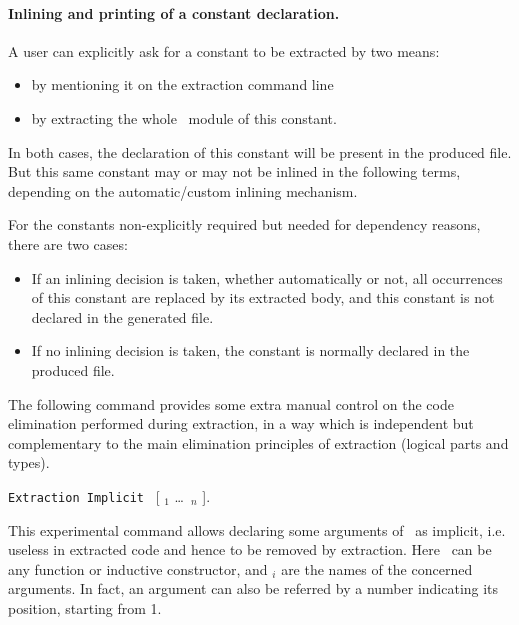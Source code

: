 \paragraph{Inlining and printing of a constant declaration.}

A user can explicitly ask for a constant to be extracted by two means:
\begin{itemize}
\item by mentioning it on the extraction command line
\item by extracting the whole \Coq\ module of this constant.
\end{itemize}
In both cases, the declaration of this constant will be present in the
produced file. 
But this same constant may or may not be inlined in the following
terms, depending on the automatic/custom inlining mechanism.  


For the constants non-explicitly required but needed for dependency
reasons, there are two cases: 
\begin{itemize}
\item If an inlining decision is taken, whether automatically or not,
all occurrences of this constant are replaced by its extracted body, and
this constant is not declared in the generated file.
\item If no inlining decision is taken, the constant is normally
  declared in the produced file. 
\end{itemize}


The following command provides some extra manual control on the
code elimination performed during extraction, in a way which
is independent but complementary to the main elimination
principles of extraction (logical parts and types).

\begin{description}
\item {}
 {\tt Extraction Implicit} \qualid\ [ \ident$_1$ \dots\ \ident$_n$ ].

This experimental command allows declaring some arguments of
\qualid\ as implicit, i.e. useless in extracted code and hence to
be removed by extraction. Here \qualid\ can be any function or
inductive constructor, and \ident$_i$ are the names of the concerned
arguments. In fact, an argument can also be referred by a number
indicating its position, starting from 1.
\end{description}

